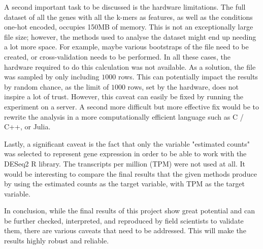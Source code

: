 \documentclass[11pt,twoside]{article}
\numberwithin{Theorem}{section}
\numberwithin{Definition}{section}
\numberwithin{Lemma}{section}
\numberwithin{Algorithm}{section}
\numberwithin{equation}{section}
\begin{document}
A second important task to be discussed is the hardware limitations. The full dataset of all the genes with all the k-mers as features, as well as the conditions one-hot encoded, occupies 150MB of memory. This is not an exceptionally large file size; however, the methods used to analyse the dataset might end up needing a lot more space. For example, maybe various bootstraps of the file need to be created, or cross-validation needs to be performed. In all these cases, the hardware required to do this calculation was not available. As a solution, the file was sampled by only including $1000$ rows. This can potentially impact the results by random chance, as the limit of $1000$ rows, set by the hardware, does not inspire a lot of trust. However, this caveat can easily be fixed by running the experiment on a server. A second more difficult but more effective fix would be to rewrite the analysis in a more computationally efficient language such as \textsf{C / C++}, or \textsf{Julia}.

Lastly, a significant caveat is the fact that only the variable "estimated counts" was selected to represent gene expression in order to be able to work with the \textsf{DESeq2 R} library. The transcripts per million (TPM) were not used at all. It would be interesting to compare the final results that the given methods produce by using the estimated counts as the target variable, with TPM as the target variable. 

In conclusion, while the final results of this project show great potential and can be further checked, interpreted, and reproduced by field scientists to validate them, there are various caveats that need to be addressed. This will make the results highly robust and reliable.  

\clearpage


\clearpage
\end{document}
